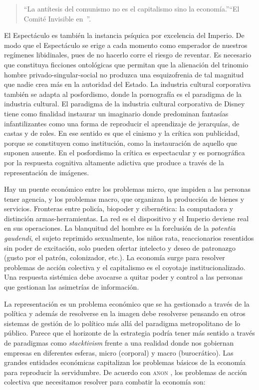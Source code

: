 \begin{quote}
  \enquote{La antítesis del comunismo no es el capitalismo sino la economía.}\enquote{El Comité Invisible en~\autocite{EconomiaConsideradaComo}}. 
\end{quote}

El Espectáculo es también la instancia psíquica por excelencia del Imperio. De modo que el Espectáculo se erige a cada momento como emperador de nuestros regímenes libidinales, pues de no hacerlo corre el riesgo de reventar. Es necesario que constituya ficciones ontológicas que permitan que la alienación del trinomio hombre privado-singular-social no produzca una esquizofrenia de tal magnitud que nadie crea más en la autoridad del Estado. La industria cultural corporativa también se adapta al posfordismo, donde la pornografía es el paradigma de la industria cultural. El paradigma de la industria cultural corporativa de Disney tiene como finalidad instaurar un imaginario donde predominan fantasías infantilizantes como una forma de reproducir el aprendizaje de jerarquías, de castas y de roles. En ese sentido es que el cinismo y la crítica son publicidad, porque se constituyen como institución, como la instauración de aquello que suponen ausente. En el posfordismo la crítica es espectacular y es pornográfica por la respuesta cognitiva altamente adictiva que produce a través de la representación de imágenes.

Hay un puente económico entre los problemas micro, que impiden a las personas tener agencia, y los problemas macro, que organizan la producción de bienes y servicios. Fronteras entre policía, biopoder y cibernética: la computadora y distinción armas-herramientas. La red es el dispositivo y el Imperio deviene real en sus operaciones. La blanquitud del hombre es la forclusión de la \emph{potentia gaudendi}, el sujeto reprimido sexualmente, los niños rata, reaccionarios resentidos sin poder de excitación, solo pueden ofertar intelecto y deseo de patronazgo (gusto por el patrón, colonizador, etc.). La economía surge para resolver problemas de acción colectiva y el capitalismo es el coyotaje institucionalizado. Una respuesta sistémica debe avocarse a quitar poder y control a las personas que gestionan las asimetrías de información.

La representación es un problema económico que se ha gestionado a través de la política y además de resolverse en la imagen debe resolverse pensando en otros sistemas de gestión de lo político más allá del paradigma metropolitano de lo público. Parece que el horizonte de la estrategia podría tener más sentido a través de paradigmas como \emph{stacktivism} \autocite{brattonStackSoftwareSovereignty2015} frente a una realidad donde nos gobiernan empresas en diferentes esferas, micro (corporal) y macro (burocrático). Las grandes entidades económicas capitalizan los problemas básicos de la economía para reproducir la servidumbre. De acuerdo con \textsc{anon} \autocite{PeopleArePeople2018}, los problemas de acción colectiva que necesitamos resolver para combatir la economía son:

